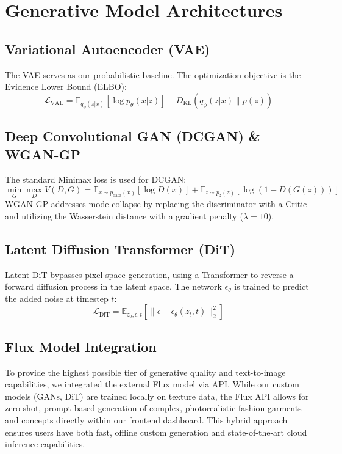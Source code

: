 \documentclass[12pt,a4paper]{article}
\begin{document}
\section{Generative Model Architectures}

\subsection{Variational Autoencoder (VAE)}
The VAE serves as our probabilistic baseline. The optimization objective is the Evidence Lower Bound (ELBO):
\begin{equation}
    \mathcal{L}_{\text{VAE}} = \mathbb{E}_{q_\phi(z|x)}[\log p_\theta(x|z)] - D_{\text{KL}}(q_\phi(z|x) \| p(z))
\end{equation}

\subsection{Deep Convolutional GAN (DCGAN) \& WGAN-GP}
The standard Minimax loss is used for DCGAN:
\begin{equation}
    \min_G \max_D V(D, G) = \mathbb{E}_{x \sim p_{\text{data}}(x)}[\log D(x)] + \mathbb{E}_{z \sim p_z(z)}[\log(1 - D(G(z)))]
\end{equation}
WGAN-GP addresses mode collapse by replacing the discriminator with a Critic and utilizing the Wasserstein distance with a gradient penalty ($\lambda = 10$).

\subsection{Latent Diffusion Transformer (DiT)}
Latent DiT bypasses pixel-space generation, using a Transformer to reverse a forward diffusion process in the latent space. The network $\epsilon_\theta$ is trained to predict the added noise at timestep $t$:
\begin{equation}
    \mathcal{L}_{\text{DiT}} = \mathbb{E}_{z_0, \epsilon, t} [ \| \epsilon - \epsilon_\theta(z_t, t) \|_2^2 ]
\end{equation}

\subsection{Flux Model Integration}
To provide the highest possible tier of generative quality and text-to-image capabilities, we integrated the external Flux model via API. While our custom models (GANs, DiT) are trained locally on texture data, the Flux API allows for zero-shot, prompt-based generation of complex, photorealistic fashion garments and concepts directly within our frontend dashboard. This hybrid approach ensures users have both fast, offline custom generation and state-of-the-art cloud inference capabilities.
\end{document}

